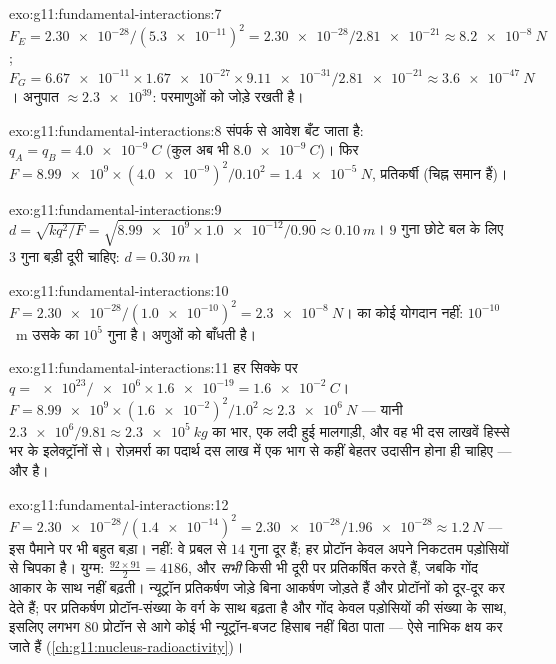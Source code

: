 \begin{solution}{exo:g11:fundamental-interactions:7}
$F_E = \num{2.30e-28}/(\num{5.3e-11})^2 = \num{2.30e-28}/\num{2.81e-21}
\approx \qty{8.2e-8}{N}$; $F_G = \num{6.67e-11} \times \num{1.67e-27} \times \num{9.11e-31} /
\num{2.81e-21} \approx \qty{3.6e-47}{N}$। अनुपात $\approx \num{2.3e39}$: परमाणुओं को
 जोड़े रखती है।
\end{solution}

\begin{solution}{exo:g11:fundamental-interactions:8}
संपर्क से आवेश बँट जाता है: $q_A = q_B = \qty{+4.0e-9}{C}$ (कुल अब भी $\qty{8.0e-9}{C}$)। फिर $F = \num{8.99e9} \times (\num{4.0e-9})^2/0.10^2 =
\qty{1.4e-5}{N}$,
प्रतिकर्षी (चिह्न समान हैं)।
\end{solution}

\begin{solution}{exo:g11:fundamental-interactions:9}
$d = \sqrt{k q^2/F} = \sqrt{\num{8.99e9} \times \num{1.0e-12}/0.90}
\approx \qty{0.10}{m}$। $9$ गुना छोटे बल के लिए $3$ गुना बड़ी दूरी चाहिए:
$d = \qty{0.30}{m}$।
\end{solution}

\begin{solution}{exo:g11:fundamental-interactions:10}
$F = \num{2.30e-28}/(\num{1.0e-10})^2 = \qty{2.3e-8}{N}$।  का कोई योगदान नहीं: $10^{-10}$~m उसके
 का $10^{5}$ गुना है। अणुओं को  बाँधती है।
\end{solution}

\begin{solution}{exo:g11:fundamental-interactions:11}
हर सिक्के पर $q = \num{e23}/\num{e6} \times \num{1.6e-19} = \qty{1.6e-2}{C}$। $F = \num{8.99e9} \times (\num{1.6e-2})^2/1.0^2 \approx
\qty{2.3e6}{N}$ --- यानी $\num{2.3e6}/9.81 \approx
\qty{2.3e5}{kg}$ का भार, एक लदी हुई
मालगाड़ी, और वह भी दस लाखवें हिस्से भर के इलेक्ट्रॉनों से। रोज़मर्रा का
पदार्थ दस लाख में एक भाग से कहीं बेहतर उदासीन होना ही चाहिए --- और है।
\end{solution}

\begin{solution}{exo:g11:fundamental-interactions:12}
$F = \num{2.30e-28}/(\num{1.4e-14})^2 = \num{2.30e-28}/\num{1.96e-28}
\approx \qty{1.2}{N}$ --- इस पैमाने पर भी बहुत बड़ा। नहीं: वे प्रबल  से $14$
गुना दूर हैं; हर प्रोटॉन केवल अपने निकटतम पड़ोसियों से चिपका है। युग्म:
$\frac{92 \times 91}{2} = 4186$, और \emph{सभी} किसी भी दूरी पर प्रतिकर्षित करते हैं, जबकि गोंद आकार
के साथ नहीं बढ़ती। न्यूट्रॉन प्रतिकर्षण जोड़े बिना आकर्षण जोड़ते हैं और
प्रोटॉनों को दूर-दूर कर देते हैं; पर प्रतिकर्षण प्रोटॉन-संख्या के वर्ग के
साथ बढ़ता है और गोंद केवल पड़ोसियों की संख्या के साथ, इसलिए लगभग $80$
प्रोटॉन से आगे कोई भी न्यूट्रॉन-बजट हिसाब नहीं बिठा पाता --- ऐसे नाभिक क्षय
कर जाते हैं (\cref{ch:g11:nucleus-radioactivity})।
\end{solution}

